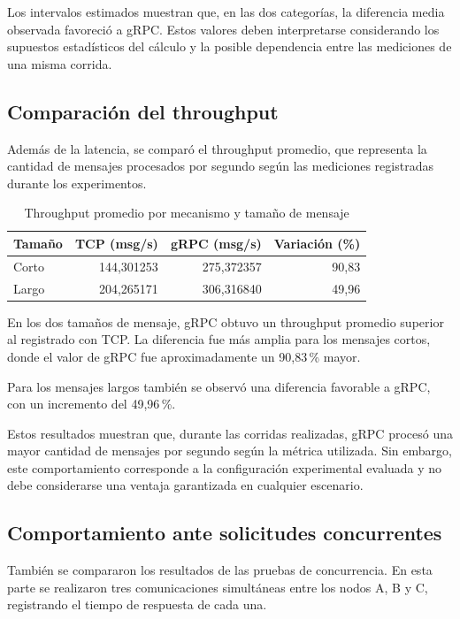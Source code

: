 Los intervalos estimados muestran que, en las dos categorías,
la diferencia media observada favoreció a gRPC. Estos valores
deben interpretarse considerando los supuestos estadísticos
del cálculo y la posible dependencia entre las mediciones
de una misma corrida.


\subsection{Comparación del throughput}

Además de la latencia, se comparó el throughput promedio, que representa
la cantidad de mensajes procesados por segundo según las mediciones
registradas durante los experimentos.

\begin{table}[htbp]
\centering
\caption{Throughput promedio por mecanismo y tamaño de mensaje}
\label{tab:comparacion-throughput}
\begin{tabular}{lrrr}
\hline
\textbf{Tamaño} & \textbf{TCP (msg/s)} &
\textbf{gRPC (msg/s)} & \textbf{Variación (\%)} \\
\hline
Corto & 144,301253 & 275,372357 & 90,83 \\
Largo & 204,265171 & 306,316840 & 49,96 \\
\hline
\end{tabular}
\end{table}

En los dos tamaños de mensaje, gRPC obtuvo un throughput promedio
superior al registrado con TCP. La diferencia fue más amplia para
los mensajes cortos, donde el valor de gRPC fue aproximadamente un
90,83\,\% mayor.

Para los mensajes largos también se observó una diferencia favorable
a gRPC, con un incremento del 49,96\,\%.

Estos resultados muestran que, durante las corridas realizadas,
gRPC procesó una mayor cantidad de mensajes por segundo según la
métrica utilizada. Sin embargo, este comportamiento corresponde
a la configuración experimental evaluada y no debe considerarse
una ventaja garantizada en cualquier escenario.

\subsection{Comportamiento ante solicitudes concurrentes}

También se compararon los resultados de las pruebas de concurrencia.
En esta parte se realizaron tres comunicaciones simultáneas entre
los nodos A, B y C, registrando el tiempo de respuesta de cada una.

